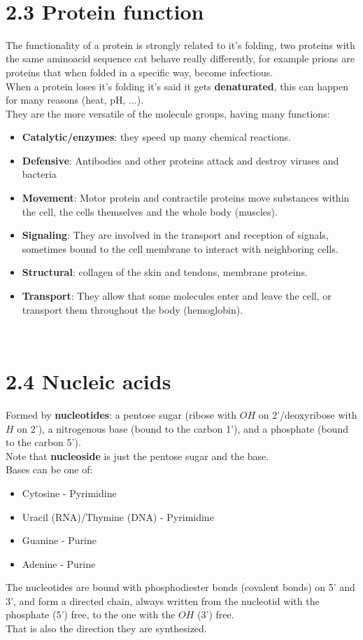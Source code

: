 \documentclass[a4paper,landscape,10pt]{cheatsheet}
\begin{document}
\hfill\\
\section*{2.3 Protein function}
The functionality of a protein is strongly related to it's folding, two proteins with the same aminoacid sequence cat
behave really differently, for example prions are proteins that when folded in a specific way, become infectious.\\
When a protein loses it's folding it's said it gets \textbf{denaturated}, this can happen for many reasons (heat, pH,
...).\\
They are the more versatile of the molecule groups, having many functions:\
\begin{itemize}
      \item \textbf{Catalytic/enzymes}: they speed up many chemical reactions.
      \item \textbf{Defensive}: Antibodies and other proteins attack and destroy viruses and bacteria
      \item \textbf{Movement}: Motor protein and contractile proteins move substances within the cell, the cells themselves
            and the whole body (muscles).
      \item \textbf{Signaling}: They are involved in the transport and reception of signals, sometimes bound to the cell
            membrane to interact with neighboring cells.
      \item \textbf{Structural}: collagen of the skin and tendons, membrane proteins.
      \item \textbf{Transport}: They allow that some molecules enter and leave the cell, or transport them throughout the
            body (hemoglobin).
\end{itemize}

\hfill\\
\section*{2.4 Nucleic acids}
Formed by \textbf{nucleotides}: a pentose sugar (ribose with $OH$ on 2'/deoxyribose with $H$ on 2'), a nitrogenous base
(bound to the carbon 1'), and a phosphate (bound to the carbon 5').\\
Note that \textbf{nucleoside} is just the pentose sugar and the base.\\
Bases can be one of:
\begin{itemize}
      \item Cytosine - Pyrimidine
      \item Uracil (RNA)/Thymine (DNA) - Pyrimidine
      \item Guanine - Purine
      \item Adenine - Purine
\end{itemize}
The nucleotides are bound with phosphodiester bonds (covalent bonds) on 5' and 3', and form a directed chain, always
written from the nucleotid with the phosphate (5') free, to the one with the $OH$ (3') free.\\
That is also the direction they are synthesized.\\
\end{document}
